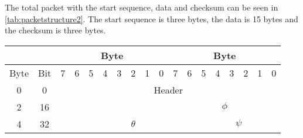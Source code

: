 The total packet with the start sequence, data and checksum can be seen in \autoref{tab:packetstructure2}. The start sequence is three bytes, the data is 15 bytes and the checksum is three bytes.
\begin{table}[H]
	\centering
	\begin{tabular}{llclllllllllllllll}
		\hline
		\multicolumn{2}{|c|}{}& \multicolumn{8}{c|}{Byte}                                                                                                                                                                           & \multicolumn{8}{c|}{Byte}                                                                                                                                                                                 \\ \hline
		\multicolumn{1}{|l|}{Byte} & \multicolumn{1}{l|}{Bit} & \multicolumn{1}{c|}{7} & \multicolumn{1}{c|}{6} & \multicolumn{1}{c|}{5} & \multicolumn{1}{c|}{4} & \multicolumn{1}{c|}{3} & \multicolumn{1}{c|}{2} & \multicolumn{1}{c|}{1} & \multicolumn{1}{c|}{0} & \multicolumn{1}{|c|}{7} & \multicolumn{1}{c|}{6} & \multicolumn{1}{c|}{5} & \multicolumn{1}{c|}{4} & \multicolumn{1}{c|}{3} & \multicolumn{1}{c|}{2} & \multicolumn{1}{c|}{1} & \multicolumn{1}{c|}{0} \\ \hline
		\multicolumn{1}{|c|}{0}    & \multicolumn{1}{c|}{0}   & \multicolumn{16}{c|}{Header}                                                                                                                                                                                                                                                                                                                                                                                        \\ \hline
		\multicolumn{1}{|c|}{2}    & \multicolumn{1}{c|}{16}  & \multicolumn{8}{c|}{}                                                                                                                                                                                 & \multicolumn{8}{c|}{$\phi$}                                                                                                                                                                                 \\ \hline
		\multicolumn{1}{|c|}{4}    & \multicolumn{1}{c|}{32}  & \multicolumn{1}{c|}{}  & \multicolumn{9}{c|}{$\theta$}                                                                                                                                                                                                  & \multicolumn{6}{c|}{$\psi$}                                                                                                                               \\ \hline

\end{tabular}
\end{table}
